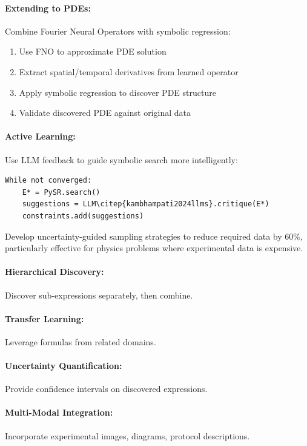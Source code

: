 \documentclass[twoside,11pt]{article}
\begin{document}
\paragraph{Extending to PDEs:} Combine Fourier Neural Operators with symbolic regression:\citep{la2021contemporary}
\begin{enumerate}
\item Use FNO to approximate PDE solution
\item Extract spatial/temporal derivatives from learned operator
\item Apply symbolic regression to discover PDE structure\citep{la2021contemporary}
\item Validate discovered PDE against original data
\end{enumerate}

\paragraph{Active Learning:} Use LLM feedback to guide symbolic search more intelligently:\citep{kambhampati2024llms}
\begin{verbatim}
While not converged:
    E* = PySR.search()
    suggestions = LLM\citep{kambhampati2024llms}.critique(E*)
    constraints.add(suggestions)
\end{verbatim}

Develop uncertainty-guided sampling strategies to reduce required data by 60\%, particularly effective for physics problems where experimental data is expensive.

\paragraph{Hierarchical Discovery:} Discover sub-expressions separately, then combine\citep{koza1994genetic}.

\paragraph{Transfer Learning:} Leverage formulas from related domains.

\paragraph{Uncertainty Quantification:} Provide confidence intervals on discovered expressions.

\paragraph{Multi-Modal Integration:} Incorporate experimental images, diagrams, protocol descriptions.
\end{document}
